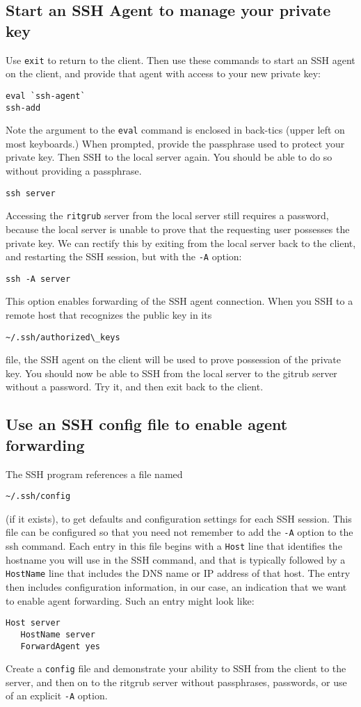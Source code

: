 \subsection{Start an SSH Agent to manage your private key}
Use {\tt exit} to return to the client.
Then use these commands to start an SSH agent on the client, and provide that agent with access to your
new private key:
\begin{verbatim}
eval `ssh-agent`	
ssh-add
\end{verbatim}
\noindent Note the argument to the {\tt eval} command is enclosed in back-tics (upper left on
most keyboards.)  When prompted, provide the passphrase used to protect your private key.
Then SSH to the local server again.  You should be able to do so without providing a passphrase.
\begin{verbatim}
ssh server
\end{verbatim}

Accessing the {\tt ritgrub} server from the local server still requires a password, because the
local server is unable to prove that the requesting user possesses the private key.  We can rectify
this by exiting from the local server back to the client, and restarting the SSH session, but with the 
{\tt -A} option:
\begin{verbatim}
ssh -A server
\end{verbatim}
\noindent
This option enables forwarding of the SSH agent connection.  When you SSH to a remote host that
recognizes the public key in its 
\begin{verbatim}
~/.ssh/authorized\_keys
\end{verbatim}
\noindent file, the SSH agent on the client will
be used to prove possession of the private key.  You should now be able to SSH from the local server to
the gitrub server without a password.  Try it, and then exit back to the client.

\subsection{Use an SSH config file to enable agent forwarding}
The SSH program references a file named 
\begin{verbatim}
~/.ssh/config
\end{verbatim}
\noindent (if it exists), to get defaults and
configuration settings for each SSH session.  This file can be configured so that you need not remember
to add the {\tt -A} option to the ssh command. Each entry in this file begins with a {\tt Host} line
that identifies the hostname you will use in the SSH command, and that is typically followed by a
{\tt HostName} line that includes the DNS name or IP address of that host.  The entry then includes
configuration information, in our case, an indication that we want to enable agent forwarding.  Such
an entry might look like:
\begin{verbatim}
Host server
   HostName server
   ForwardAgent yes
\end{verbatim}
\noindent
Create a {\tt config} file and demonstrate your ability to SSH from the client to the server, and
then on to the ritgrub server without passphrases, passwords, or use of an explicit {\tt -A} option.

